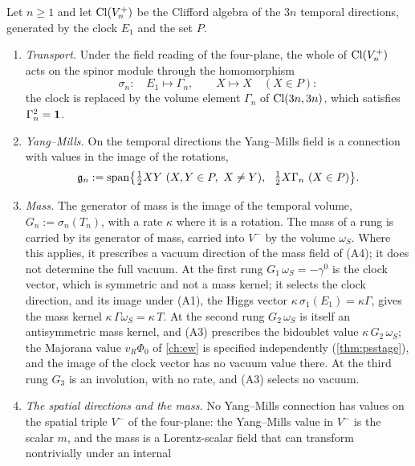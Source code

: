 \begin{definition}
\label{def:hyp}
Let $n\ge1$ and let $\mathrm{Cl}(V^+_n)$ be the Clifford algebra of the $3n$ temporal directions, generated by the clock $E_1$ and the set $P$.
\begin{enumerate}[label=(A\arabic*),leftmargin=2.6em,itemsep=2pt]
\item \emph{Transport.} Under the field reading of the four-plane, the whole of $\mathrm{Cl}(V^+_n)$ acts on the spinor module through the
homomorphism
\begin{equation}
\label{eq:sigma}
\sigma_n:\quad E_1\longmapsto\Gamma_n,\qquad X\longmapsto X\quad(X\in P):
\end{equation}
the clock is replaced by the volume element $\Gamma_n$ of $\mathrm{Cl}(3n,3n)$, which satisfies $\Gamma_n^2=\mathbf 1$.
\item \emph{Yang--Mills.} On the temporal directions the Yang--Mills field is a connection with values in the image of the rotations,
\begin{equation}
\label{eq:gn}
\mathfrak g_n:=\mathrm{span}\bigl\{\tfrac12 XY\ (X,Y\in P,\ X\ne Y),\ \ \tfrac12 X\Gamma_n\ (X\in P)\bigr\}.
\end{equation}
\item \emph{Mass.} The generator of mass is the image of the temporal volume, $G_n:=\sigma_n(T_n)$, with a rate $\kappa$ where it is a
rotation. The mass of a rung is carried by its generator of mass, carried into $V^-$ by the volume $\omega_S$. Where this applies, it
prescribes a vacuum direction of the mass field of (A4); it does not determine the full vacuum. At the first rung $G_1\,\omega_S=-\gamma^0$ is the clock vector, which is symmetric and not a mass kernel; it
selects the clock direction, and its image under (A1), the Higgs vector $\kappa\,\sigma_1(E_1)=\kappa\Gamma$, gives the mass kernel
$\kappa\,\Gamma\omega_S=\kappa\,T$. At the second rung $G_2\,\omega_S$ is itself an antisymmetric mass kernel, and (A3) prescribes the bidoublet value
$\kappa\,G_2\,\omega_S$; the Majorana value $v_R\Phi_0$ of \cref{ch:ew} is specified independently (\cref{thm:psstage}), and the image of the
clock vector has no vacuum value there. At the third rung $G_3$ is an involution, with no rate,
and (A3) selects no vacuum.
\item \emph{The spatial directions and the mass.} No Yang--Mills connection has values on the spatial triple $V^-$ of the four-plane: the
Yang--Mills value in $V^-$ is the scalar $m$, and the mass is a Lorentz-scalar field that can transform nontrivially under an internal

\end{enumerate}
\end{definition}
